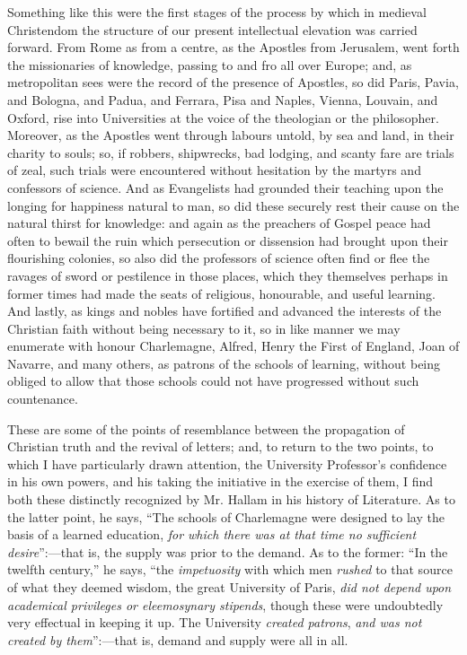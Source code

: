 Something like this were the
first stages of the process by which in medieval Christendom the
structure of our present intellectual elevation was carried forward.
From Rome as from a centre, as the Apostles from Jerusalem, went forth
the missionaries of knowledge, passing to and fro all over Europe;
and, as metropolitan sees were the record of the presence of Apostles,
so did Paris, Pavia, and Bologna, and Padua, and Ferrara, Pisa
and Naples, Vienna, Louvain, and Oxford, rise into Universities at the
voice of the theologian or the philosopher. Moreover, as the Apostles
went through labours untold, by sea and land, in their charity to
souls; so, if robbers, shipwrecks, bad lodging, and scanty fare are
trials of zeal, such trials were encountered without hesitation by the
martyrs and confessors of science. And as Evangelists had grounded
their teaching upon the longing for happiness natural to man, so did
these securely rest their cause on the natural thirst for knowledge:
and again as the preachers of Gospel peace had often to bewail the
ruin which persecution or dissension had brought upon their
flourishing colonies, so also did the professors of science often find
or flee the ravages of sword or pestilence in those places, which they
themselves perhaps in former times had made the seats of religious,
honourable, and useful learning. And lastly, as kings and nobles have
fortified and advanced the interests of the Christian faith without
being necessary to it, so in like manner we may enumerate with honour
Charlemagne, Alfred, Henry the First of England, Joan of Navarre, and
many others, as patrons of the schools of learning, without being
obliged to allow that those schools could not have progressed without
such countenance.

These are some of the points
of resemblance between the propagation of Christian truth and the
revival of letters; and, to return to the two points, to which I have
particularly drawn attention, the University Professor's confidence in
his own powers, and his taking the initiative in the exercise of them,
I find both these distinctly recognized by Mr. Hallam in his history
of Literature. As to the latter point, he says, ``The schools of
Charlemagne were designed to lay the basis of a learned education,
\emph{for which there was at that time no sufficient desire}'':—that
is, the supply was prior to the demand. As to the former: ``In the
twelfth century,'' he says, ``the \emph{impetuosity} with which men \emph{rushed}
to that source of what they deemed wisdom, the great University of
Paris, \emph{did not depend upon academical privileges or eleemosynary
stipends}, though these were undoubtedly very effectual in keeping
it up. The University \emph{created patrons}, \emph{and was not created
by them}'':—that is, demand and supply were all in all.

